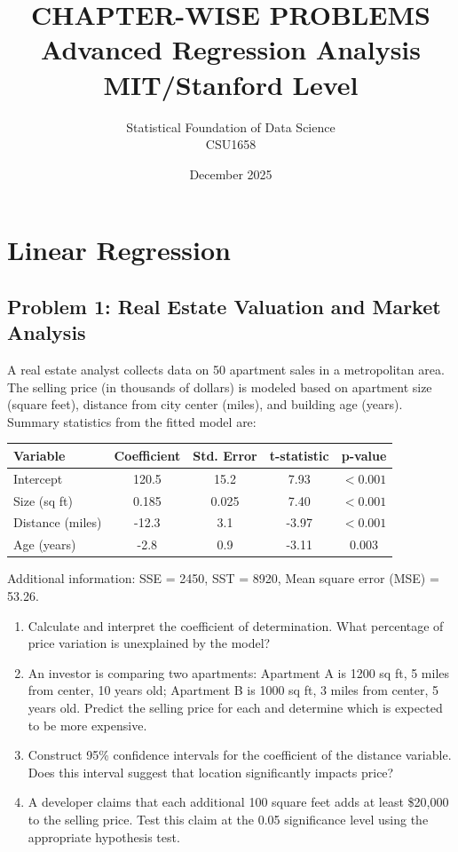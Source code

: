 \documentclass[12pt]{article}
\title{CHAPTER-WISE PROBLEMS\\
\large Advanced Regression Analysis\\
\small MIT/Stanford Level}
\author{Statistical Foundation of Data Science\\
CSU1658}
\date{December 2025}
\begin{document}
\maketitle

\tableofcontents
\newpage


\section{Linear Regression}

\subsection*{Problem 1: Real Estate Valuation and Market Analysis}

A real estate analyst collects data on 50 apartment sales in a metropolitan area. The selling price (in thousands of dollars) is modeled based on apartment size (square feet), distance from city center (miles), and building age (years). Summary statistics from the fitted model are:

\begin{center}
\begin{tabular}{lcccc}
\toprule
Variable & Coefficient & Std. Error & t-statistic & p-value \\
\midrule
Intercept & 120.5 & 15.2 & 7.93 & $< 0.001$ \\
Size (sq ft) & 0.185 & 0.025 & 7.40 & $< 0.001$ \\
Distance (miles) & -12.3 & 3.1 & -3.97 & $< 0.001$ \\
Age (years) & -2.8 & 0.9 & -3.11 & 0.003 \\
\bottomrule
\end{tabular}
\end{center}

Additional information: SSE = 2450, SST = 8920, Mean square error (MSE) = 53.26.

\begin{enumerate}[label=(\alph*)]
\item Calculate and interpret the coefficient of determination. What percentage of price variation is unexplained by the model?

\item An investor is comparing two apartments: Apartment A is 1200 sq ft, 5 miles from center, 10 years old; Apartment B is 1000 sq ft, 3 miles from center, 5 years old. Predict the selling price for each and determine which is expected to be more expensive.

\item Construct 95\% confidence intervals for the coefficient of the distance variable. Does this interval suggest that location significantly impacts price?

\item A developer claims that each additional 100 square feet adds at least \$20,000 to the selling price. Test this claim at the 0.05 significance level using the appropriate hypothesis test.
\end{enumerate}
\end{document}
